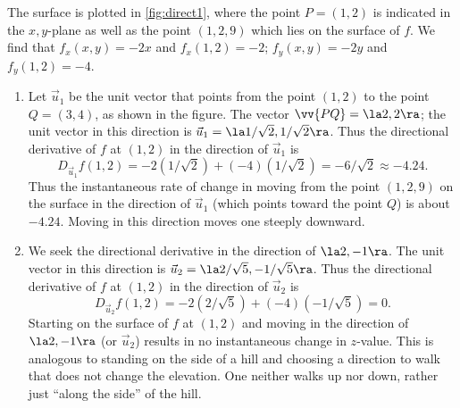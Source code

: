 {
The surface is plotted in \autoref{fig:direct1}, where the point $P=(1,2)$ is indicated in the $x,y$-plane as well as the point $(1,2,9)$ which lies on the surface of $f$. We find that $f_x(x,y) = -2x$ and $f_x(1,2) = -2$; $f_y(x,y) = -2y$ and $f_y(1,2) = -4$. 
\begin{enumerate}
	\item Let $\vec u_1$ be the unit vector that points from the point $(1,2)$ to the point $Q=(3,4)$, as shown in the figure. The vector $\vv{PQ} = \la 2,2\ra$; the unit vector in this direction is $\vec u_1=\la 1/\sqrt{2}, 1/\sqrt{2}\ra$. Thus the directional derivative of $f$ at $(1,2)$ in the direction of $\vec u_1$ is
	$$D_{\vec u_1}f(1,2) = -2(1/\sqrt{2}) +(-4)(1/\sqrt{2}) = -6/\sqrt{2}\approx -4.24.$$
	Thus the instantaneous rate of change in moving from the point $(1,2,9)$ on the surface in the direction of $\vec u_1$ (which points toward the point $Q$) is about $-4.24$. Moving in this direction moves one steeply downward.
	
	\item		We seek the directional derivative in the direction of $\la 2,-1\ra$. The unit vector in this direction is $\vec u_2 = \la 2/\sqrt{5},-1/\sqrt{5}\ra$. Thus the directional derivative of $f$ at $(1,2)$ in the direction of $\vec u_2$ is
	$$D_{\vec u_2}f(1,2) = -2(2/\sqrt{5})+(-4)(-1/\sqrt{5}) = 0.$$
	Starting on the surface of $f$ at $(1,2)$ and moving in the direction of $\la 2,-1\ra$ (or $\vec u_2$) results in no instantaneous change in $z$-value. This is analogous to standing on the side of a hill and choosing a direction to walk that does not change the elevation. One neither walks up nor down, rather just ``along the side'' of the hill.
	

\end{enumerate}}
